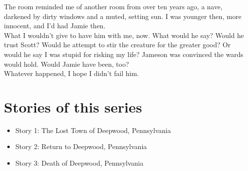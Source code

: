 \documentclass[a5paper]{scrartcl}
\begin{document}
The room reminded me of another room from over ten years ago, a nave, darkened by dirty windows and a muted, setting sun. I was younger then, more innocent, and I'd had Jamie then.\\


What I wouldn't give to have him with me, now.  What would he say? Would he trust Scott? Would he attempt to stir the creature for the greater good? Or would he say I was stupid for risking my life? Jameson was convinced the wards would hold. Would Jamie have been, too?\\


Whatever happened, I hope I didn't fail him.
\clearpage
\section*{Stories of this series}

\begin{itemize}
    \item Story 1: The Lost Town of Deepwood, Pennsylvania
    \item Story 2: Return to Deepwood, Pennsylvania
    \item Story 3: Death of Deepwood, Pennsylvania
\end{itemize}
\end{document}
